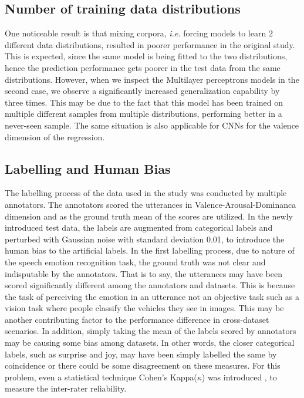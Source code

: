 \documentclass[a4paper,11pt]{article}
\begin{document}
\subsection{Number of training data distributions}
One noticeable result is that mixing corpora, \textit{i.e.} forcing models to learn 2 different data distributions, resulted in poorer performance in the original study. This is expected, since the same model is being fitted to the two distributions, hence the prediction performance gets poorer in the test data from the same distributions. However, when we inspect the Multilayer perceptrons models in the second case, we observe a significantly increased generalization capability by three times. This may be due to the fact that this model has been trained on multiple different samples from multiple distributions, performing better in a never-seen sample. The same situation is also applicable for CNNs for the valence dimension of the regression.  

\subsection{Labelling and Human Bias}

The labelling process of the data used in the study was conducted by multiple annotators. The annotators scored the utterances in Valence-Arousal-Dominanca dimension and as the ground truth mean of the scores are utilized. In the newly introduced test data, the labels are augmented from categorical labels and perturbed with Gaussian noise with standard deviation 0.01, to introduce the human bias to the artificial labels. In the first labelling process, due to nature of the speech emotion recognition task, the ground truth was not clear and indisputable by the annotators. That is to say, the utterances may have been scored significantly different among the annotators and datasets. This is because the task of perceiving the emotion in an utterance not an objective task such as a vision task where people classify the vehicles they see in images. This may be another contributing factor to the performance difference in cross-dataset scenarios. In addition, simply taking the mean of the labels scored by annotators may be causing some bias among datasets. In other words, the closer categorical labels, such as surprise and joy, may have been simply labelled the same by coincidence or there could be some disagreement on these measures. For this problem, even a statistical technique Cohen's Kappa($\kappa$) was introduced \cite{cohenskappa}, to measure the inter-rater reliability.
\end{document}
